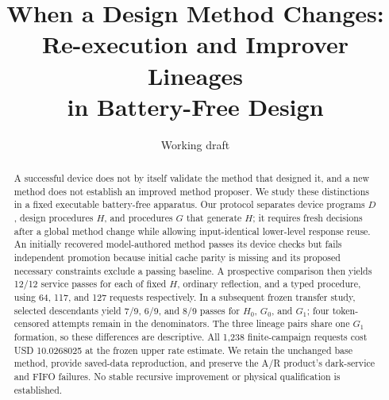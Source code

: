 \documentclass[10pt]{article}
\title{When a Design Method Changes:\\Re-execution and Improver Lineages\\in Battery-Free Design}
\author{Working draft}
\date{}
\begin{document}
\maketitle
\begin{abstract}
A successful device does not by itself validate the method that designed it,
and a new method does not establish an improved method proposer. We study these
distinctions in a fixed executable battery-free apparatus. Our protocol separates
device programs $D$, design procedures $H$, and procedures $G$ that generate $H$;
it requires fresh decisions after a global method change while allowing
input-identical lower-level response reuse. An initially recovered model-authored
method passes its device checks but fails independent promotion because initial
cache parity is missing and its proposed necessary constraints exclude a passing
baseline. A prospective comparison then yields 12/12 service passes for each of
fixed $H$, ordinary reflection, and a typed procedure, using 64, 117, and 127
requests respectively. In a subsequent frozen transfer study, selected descendants
yield 7/9, 6/9, and 8/9 passes for $H_0$, $G_0$, and $G_1$; four token-censored
attempts remain in the denominators. The three lineage pairs share one $G_1$
formation, so these differences are descriptive. All 1,238 finite-campaign
requests cost USD 10.0268025 at the frozen upper rate estimate. We retain the
unchanged base method, provide saved-data reproduction, and preserve the A/R
product's dark-service and FIFO failures. No stable recursive improvement or
physical qualification is established.
\end{abstract}

\end{document}

